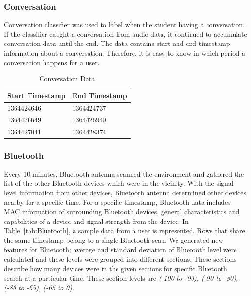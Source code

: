 \documentclass[12pt,oneandhalf,chaparabic,lfm,phd,eng,oneside,pntc]{gsufbe}
\begin{document}
\subsubsection{Conversation}
\label{subsubsec:Conversation}
Conversation classifier was used to label when the student having a conversation. If the classifier caught a conversation from audio data, it continued to accumulate conversation data until the end. The data contains start and end timestamp information about a conversation. Therefore, it is easy to know in which period a conversation happens for a user.

\begin{table}[b!]
\centering
\caption{Conversation Data}
\label{tab:Conversation}
\begin{tabular}{|l|l|}
\hline
Start Timestamp & End Timestamp \\ \hline
1364424646       & 1364424737     \\
1364426649       & 1364426940     \\
1364427041       & 1364428374     \\ \hline
\end{tabular}
\end{table}


\subsubsection{Bluetooth}
\label{subsubsec:Bluetooth}
Every 10 minutes, Bluetooth antenna scanned the environment and gathered the list of the other Bluetooth devices which were in the vicinity. With the signal level information from other devices, Bluetooth antenna determined other devices nearby for a specific time. For a specific timestamp, Bluetooth data includes MAC information of surrounding Bluetooth devices, general characteristics and capabilities of a device and signal strength from the device. In Table~\ref{tab:Bluetooth}, a sample data from a user is represented. Rows that share the same timestamp belong to a single Bluetooth scan. We generated new features for Bluetooth; average and standard deviation of Bluetooth level were calculated and these levels were grouped into different sections. These sections describe how many devices were in the given sections for specific Bluetooth search at a particular time. These section levels are \textit{(-100 to -90), (-90 to -80), (-80 to -65), (-65 to 0)}.
\end{document}
